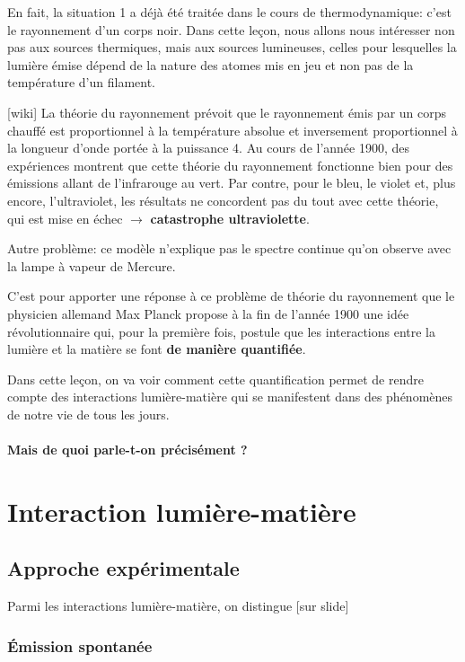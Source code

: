 \documentclass[11pt]{report}
\numberwithin{figure}{section}
\numberwithin{equation}{section}
\numberwithin{table}{section}
\newcommand{\1}{\boldsymbol{1}}
\begin{document}
En fait, la situation 1 a déjà été traitée dans le cours de thermodynamique: c'est le rayonnement d'un corps noir.  Dans cette leçon, nous allons nous intéresser non pas aux sources thermiques, mais aux sources lumineuses, celles pour lesquelles la lumière émise dépend de la nature des atomes mis en jeu et non pas de la température d’un filament.

[wiki] La théorie du rayonnement prévoit que le rayonnement émis par un corps chauffé est proportionnel à la température absolue et inversement proportionnel à la longueur d'onde portée à la puissance 4. Au cours de l'année 1900, des expériences montrent que cette théorie du rayonnement fonctionne bien pour des émissions allant de l'infrarouge au vert. Par contre, pour le bleu, le violet et, plus encore, l'ultraviolet, les résultats ne concordent pas du tout avec cette théorie, qui est mise en échec $\rightarrow$ \textbf{catastrophe ultraviolette}.

Autre problème: ce modèle n'explique pas le spectre continue qu'on observe avec la lampe à vapeur de Mercure.

C'est pour apporter une réponse à ce problème de théorie du rayonnement que le physicien allemand Max Planck propose à la fin de l'année 1900 une idée révolutionnaire qui, pour la première fois, postule que {les interactions entre la lumière et la matière se font \textbf{de manière quantifiée}}.

Dans cette leçon, on va voir comment cette quantification permet de rendre compte des  interactions lumière-matière qui se manifestent dans des phénomènes de notre vie de tous les jours.

\paragraph*{Mais de quoi parle-t-on précisément ?}  
  
\section{Interaction lumière-matière}

\subsection{Approche expérimentale}

Parmi les interactions lumière-matière, on distingue [sur slide] 

\subsubsection{Émission spontanée}
\end{document}
